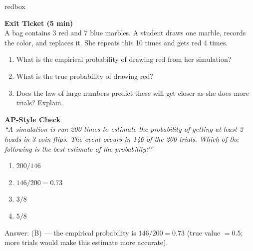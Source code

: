 \documentclass[10pt]{article}
\begin{document}
\begin{skillbox}{redbox}
\begin{minipage}[t]{0.48\linewidth}
    \textbf{Exit Ticket (5 min)}\\
    A bag contains 3 red and 7 blue marbles. A student draws one marble, records the
    color, and replaces it. She repeats this 10 times and gets red 4 times.
    \begin{enumerate}
        \item What is the empirical probability of drawing red from her simulation?
        \item What is the true probability of drawing red?
        \item Does the law of large numbers predict these will get closer as she does
              more trials? Explain.
    \end{enumerate}
\end{minipage}
\hfill
\begin{minipage}[t]{0.48\linewidth}
    \textbf{AP-Style Check}\\
    \textit{``A simulation is run 200 times to estimate the probability of getting at
    least 2 heads in 3 coin flips. The event occurs in 146 of the 200 trials. Which
    of the following is the best estimate of the probability?''}
    \begin{enumerate}[label=(\Alph*)]
        \item $200/146$
        \item $146/200 = 0.73$
        \item $3/8$
        \item $5/8$
    \end{enumerate}
    Answer: (B) --- the empirical probability is $146/200 = 0.73$ (true value $= 0.5$;
    more trials would make this estimate more accurate).
\end{minipage}
\end{skillbox}
\end{document}
